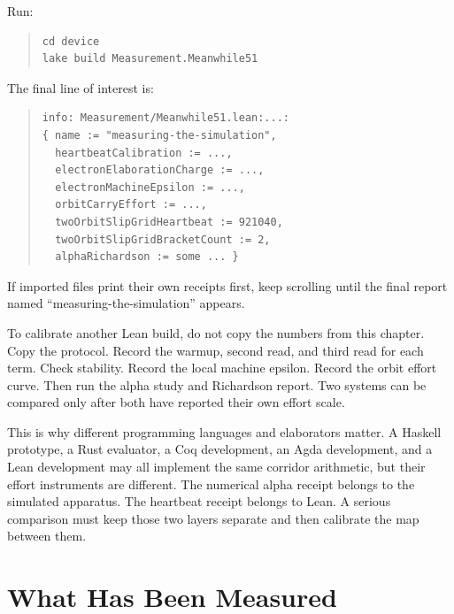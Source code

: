 Run:
\begin{quote}\small
\begin{verbatim}
cd device
lake build Measurement.Meanwhile51
\end{verbatim}
\end{quote}
The final line of interest is:
\begin{quote}\small
\begin{verbatim}
info: Measurement/Meanwhile51.lean:...:
{ name := "measuring-the-simulation",
  heartbeatCalibration := ...,
  electronElaborationCharge := ...,
  electronMachineEpsilon := ...,
  orbitCarryEffort := ...,
  twoOrbitSlipGridHeartbeat := 921040,
  twoOrbitSlipGridBracketCount := 2,
  alphaRichardson := some ... }
\end{verbatim}
\end{quote}
If imported files print their own receipts first, keep scrolling until the final report named
``measuring-the-simulation'' appears.

To calibrate another Lean build, do not copy the numbers from this chapter. Copy the protocol. Record the
warmup, second read, and third read for each term. Check stability. Record the local machine epsilon. Record the
orbit effort curve. Then run the alpha study and Richardson report. Two systems can be compared only after both
have reported their own effort scale.

This is why different programming languages and elaborators matter. A Haskell prototype, a Rust evaluator, a
Coq development, an Agda development, and a Lean development may all implement the same corridor arithmetic, but
their effort instruments are different. The numerical alpha receipt belongs to the simulated apparatus. The
heartbeat receipt belongs to Lean. A serious comparison must keep those two layers separate and then calibrate
the map between them.

\section{What Has Been Measured}

